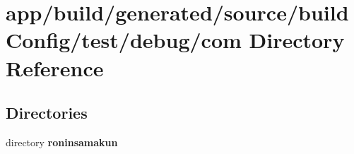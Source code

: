 \section{app/build/generated/source/build\+Config/test/debug/com Directory Reference}
\label{dir_4def1b44d402f0092309372d4443775b}
\subsection*{Directories}
\begin{DoxyCompactItemize}
\item 
directory {\bf roninsamakun}
\end{DoxyCompactItemize}
